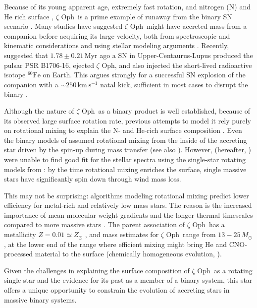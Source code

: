 \documentclass[twocolumn,twocolappendix,trackchanges]{aastex63}
\newcommand{\kms}{{\mathrm{km\ s^{-1}}}}
\newcommand{\zoph}{$\zeta$ Oph}
\begin{document}
Because of its young apparent age, extremely fast rotation, and nitrogen
(N) and He rich surface \citep[e.g.,][]{herrero:92, blaauw:93,
  villamariz:05, marcolino:09}, \zoph\ is a prime example of runaway from the binary SN scenario \citep{blaauw:93}. Many studies have suggested
\zoph\ might have accreted mass from a companion before acquiring its
large velocity, both from spectroscopic and kinematic considerations
\citep[e.g.,][]{blaauw:93, hoogerwerf:00, hoogerwerf:01, tetzlaff:10,
  neuhauser:20} and using stellar modeling arguments
\citep[e.g.,][]{vanrensbergen:96}. Recently, \cite{neuhauser:20}
suggested that $1.78\pm0.21$\,Myr ago a SN in
Upper-Centaurus-Lupus produced the pulsar PSR B1706-16, ejected \zoph,
and also injected the short-lived radioactive isotope
$^{60}\mathrm{Fe}$ on Earth. This argues strongly for a successful
SN explosion of the companion with a $\sim 250\,\kms$ natal
kick, sufficient in most cases to disrupt the binary
\citep[e.g.,][]{tauris:15, renzo:19walk, evans:20}.

Although the nature of \zoph\ as a binary product is well established,
because of its observed large surface rotation rate, previous attempts
to model it rely purely on rotational mixing to explain the N- and
He-rich surface composition \cite[e.g.,][]{maeder:00}. Even the binary
models of \cite{vanrensbergen:96} assumed rotational mixing from the
inside of the accreting star driven by the spin-up during mass
transfer (see also \citealt{cantiello:07}). However, \cite{villamariz:05}
(hereafter, ) were unable to find good fit
for the stellar spectra using the single-star rotating models from
\cite{meynet:00, meynet:03}: by the time rotational mixing enriches
the surface, single massive stars have significantly spin down through
wind mass loss.

This may not be surprising: algorithms modeling rotational mixing
predict lower efficiency for metal-rich and relatively low mass
stars. The reason is the increased importance of mean molecular weight
gradients and the longer thermal timescales compared to more massive
stars \citep[e.g.,][]{yoon:06, perna:14}. The parent association of
\zoph\ has a metallicity $Z=0.01\simeq Z_\odot$ \citep[based on
asteroseismology from][]{murphy:21}, and mass estimates for \zoph\
range from $13-25\,M_\odot$, at the lower end of the range where
efficient mixing might bring He and CNO-processed material to the
surface (chemically homogeneous evolution, \citealt{maeder:00}).

Given the challenges in explaining the surface composition of \zoph\
as a rotating single star and the evidence for its past as a member of
a binary system, this star offers a unique opportunity to constrain
the evolution of accreting stars in massive binary systems.
\end{document}
